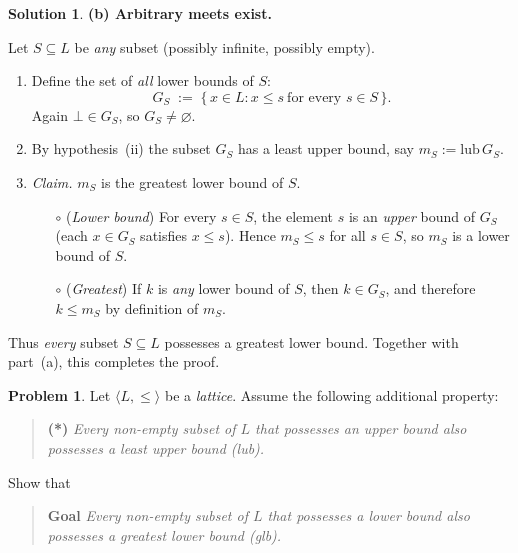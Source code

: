 \documentclass[12pt]{article}
\theoremstyle{definition} %
\newtheorem{solution}{Solution}
\newtheorem{problem}{Problem}
\theoremstyle{plain} %
\begin{document}
\begin{solution}
      \bigskip
      \textbf{(b) Arbitrary meets exist.}
      
      Let $S\subseteq L$ be \emph{any} subset (possibly infinite, possibly empty).
      
      \begin{enumerate}
          \item Define the set of \emph{all} lower bounds of $S$:
          \[
             G_S\;:=\;\{\,x\in L : x\le s\ \text{for every }s\in S\,\}.
          \]
          Again $\bot\in G_S$, so $G_S\neq\varnothing$.
      
          \item By hypothesis~(ii) the subset $G_S$ has a least upper bound,
                say $m_S:=\text{lub}\,G_S$.
      
          \item\label{it:ms_is_glb} \emph{Claim.} $m_S$ is the greatest lower bound of $S$.
      
                \begin{enumerate}
                    \item[$\circ$] (\emph{Lower bound})  
                      For every $s\in S$, the element $s$ is an \emph{upper} bound of $G_S$ (each $x\in G_S$ satisfies $x\le s$).  
                      Hence $m_S\le s$ for all $s\in S$, so $m_S$ is a lower bound of $S$.
      
                    \item[$\circ$] (\emph{Greatest})  
                      If $k$ is \emph{any} lower bound of $S$, then $k\in G_S$,
                      and therefore $k\le m_S$ by definition of $m_S$.
                \end{enumerate}
      \end{enumerate}
      Thus \emph{every} subset $S\subseteq L$ possesses a greatest lower bound.  Together with part~(a), this completes the proof.
      \end{solution}
      \begin{problem}
        Let $\langle L,\le\rangle$ be a \emph{lattice}.  
        Assume the following additional property:
        
        \begin{quote}
        \textbf{(*)}\quad
        \emph{Every non-empty subset of $L$ that possesses an \emph{upper} bound also
        possesses a \emph{least} upper bound (lub).}
        \end{quote}
        
        Show that
        
        \begin{quote}
        \textbf{Goal}\quad
        \emph{Every non-empty subset of $L$ that possesses a \emph{lower} bound
        also possesses a \emph{greatest} lower bound (glb).}
        \end{quote}
        \end{problem}
        
\end{document}

